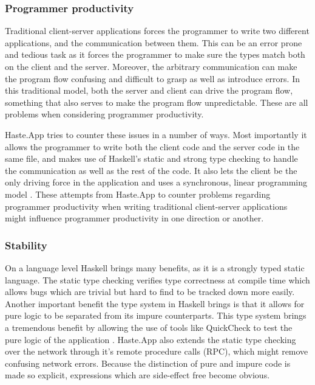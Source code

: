 \documentclass[a4paper]{article}
\begin{document}
\subsubsection{Programmer productivity}
\label{sec:programmer_productivity}
Traditional client-server applications forces the programmer to write two different applications, and the communication between them. This can be an error prone and tedious task as it forces the programmer to make sure the types match both on the client and the server. Moreover, the arbitrary communication can make the program flow confusing and difficult to grasp as well as introduce errors. In this traditional model, both the server and client can drive the program flow, something that also serves to make the program flow unpredictable. These are all problems when considering programmer productivity.

Haste.App tries to counter these issues in a number of ways. Most importantly it allows the programmer to write both the client code and the server code in the same file, and makes use of Haskell's static and strong type checking to handle the communication as well as the rest of the code. It also lets the client be the only driving force in the application and uses a synchronous, linear programming model \cite{ekblad2015seamless}. These attempts from Haste.App to counter problems regarding programmer productivity when writing traditional client-server applications might influence programmer productivity in one direction or another.


\subsubsection{Stability}
On a language level Haskell brings many benefits, as it is a strongly typed static language. The static type checking verifies type correctness at compile time which allows bugs which are trivial but hard to find to be tracked down more easily. Another important benefit the type system in Haskell brings is that it allows for pure logic to be separated from its impure counterparts. This type system brings a tremendous benefit by allowing the use of tools like QuickCheck to test the pure logic of the application \cite{Claessen:2011:QLT:1988042.1988046}. Haste.App also extends the static type checking over the network through it's remote procedure calls (RPC), which might remove confusing network errors. Because the distinction of pure and impure code is made so explicit, expressions which are side-effect free become obvious.
\end{document}
